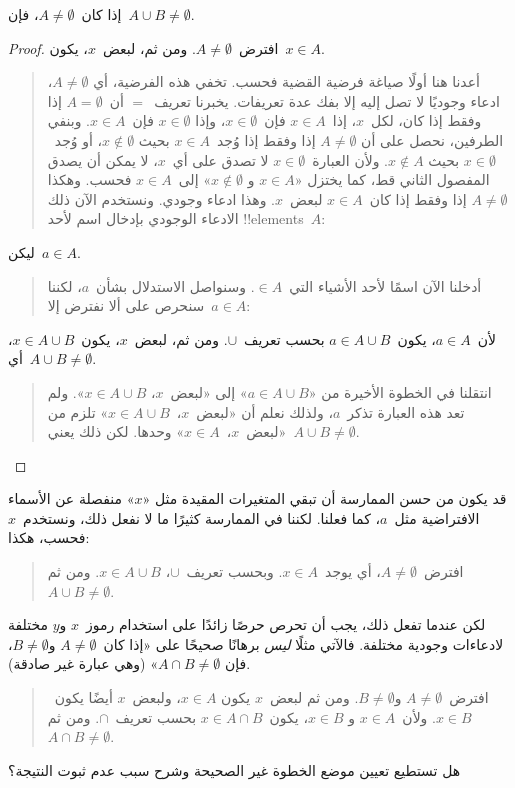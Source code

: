 \documentclass[../../../include/open-logic-section]{subfiles}
\begin{document}
\begin{prop}
إذا كان~$A \neq \emptyset$، فإن~$A \cup B \neq \emptyset$.
\end{prop}

\begin{proof}
  افترض~$A \neq \emptyset$. ومن ثم، لبعض~$x$، يكون~$x \in A$.
  \begin{quote}
    أعدنا هنا أولًا صياغة فرضية القضية فحسب. تخفي هذه الفرضية، أي
    $A \neq \emptyset$، ادعاء وجوديًا لا تصل إليه إلا بفك عدة
    تعريفات. يخبرنا تعريف~$=$ أن~$A = \emptyset$ إذا وفقط إذا كان،
    لكل~$x$، إذا~$x \in A$ فإن~$x \in \emptyset$، وإذا
    $x \in \emptyset$ فإن~$x \in A$. وبنفي الطرفين، نحصل على أن
    $A \neq \emptyset$ إذا وفقط إذا وُجد~$x \in A$ بحيث
    $x \notin \emptyset$، أو وُجد~$x \in \emptyset$ بحيث
    $x \notin A$. ولأن العبارة~$x \in \emptyset$ لا تصدق على أي~$x$،
    لا يمكن أن يصدق المفصول الثاني قط، كما يختزل «$x \in A$ و
    $x \notin \emptyset$» إلى~$x \in A$ فحسب. وهكذا
    $A \neq \emptyset$ إذا وفقط إذا كان~$x \in A$ لبعض~$x$. وهذا
    ادعاء وجودي. ونستخدم الآن ذلك الادعاء الوجودي بإدخال اسم لأحد
    !!{element}s~$A$:
  \end{quote}
  ليكن~$a \in A$.
  \begin{quote}
    أدخلنا الآن اسمًا لأحد الأشياء التي~$\in A$. وسنواصل الاستدلال
    بشأن~$a$، لكننا سنحرص على ألا نفترض إلا~$a \in A$:
  \end{quote}
  لأن~$a \in A$، يكون~$a \in A \cup B$ بحسب تعريف~$\cup$. ومن ثم،
  لبعض~$x$، يكون~$x \in A \cup B$، أي~$A \cup B \neq \emptyset$.
  \begin{quote}
    انتقلنا في الخطوة الأخيرة من «$a \in A \cup B$» إلى «لبعض~$x$،
    $x \in A \cup B$». ولم تعد هذه العبارة تذكر~$a$، ولذلك نعلم أن
    «لبعض~$x$،~$x \in A \cup B$» تلزم من «لبعض~$x$،~$x \in A$»
    وحدها. لكن ذلك يعني~$A \cup B \neq \emptyset$.
  \end{quote}
\end{proof}

قد يكون من حسن الممارسة أن تبقي المتغيرات المقيدة مثل «$x$» منفصلة
عن الأسماء الافتراضية مثل~$a$، كما فعلنا. لكننا في الممارسة كثيرًا
ما لا نفعل ذلك، ونستخدم~$x$ فحسب، هكذا:
\begin{quote}
افترض~$A \neq \emptyset$، أي يوجد~$x \in A$. وبحسب تعريف~$\cup$،
$x \in A \cup B$. ومن ثم~$A \cup B \neq \emptyset$.
\end{quote}
لكن عندما تفعل ذلك، يجب أن تحرص حرصًا زائدًا على استخدام رموز~$x$
و$y$ مختلفة لادعاءات وجودية مختلفة. فالآتي مثلًا \emph{ليس} برهانًا
صحيحًا على «إذا كان~$A \neq \emptyset$ و$B \neq \emptyset$، فإن
$A \cap B \neq \emptyset$» (وهي عبارة غير صادقة).
\begin{quote}
افترض~$A \neq \emptyset$ و$B \neq \emptyset$. ومن ثم لبعض~$x$ يكون
$x \in A$، ولبعض~$x$ أيضًا يكون~$x \in B$. ولأن~$x \in A$ و
$x \in B$، يكون~$x \in A \cap B$ بحسب تعريف~$\cap$. ومن ثم
$A \cap B \neq \emptyset$.
\end{quote}
هل تستطيع تعيين موضع الخطوة غير الصحيحة وشرح سبب عدم ثبوت النتيجة؟
\end{document}
